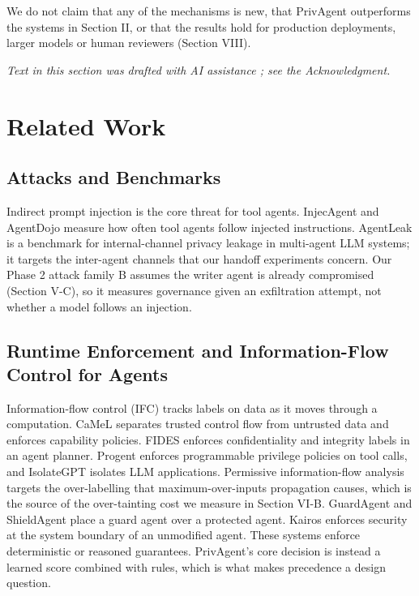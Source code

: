 \documentclass{ieeeaccess}
\begin{document}
We do not claim that any of the mechanisms is new, that PrivAgent outperforms the systems in Section II, or that the results hold for production deployments, larger models or human reviewers (Section VIII).

\emph{Text in this section was drafted with AI assistance \cite{claude}; see the Acknowledgment.}

\section{Related Work}\label{sec:II}

\subsection{Attacks and Benchmarks}

Indirect prompt injection \cite{greshake} is the core threat for tool agents. InjecAgent \cite{injecagent} and AgentDojo \cite{agentdojo} measure how often tool agents follow injected instructions. AgentLeak \cite{agentleak} is a benchmark for internal-channel privacy leakage in multi-agent LLM systems; it targets the inter-agent channels that our handoff experiments concern. %
Our Phase 2 attack family B assumes the writer agent is already compromised (Section V-C), so it measures governance given an exfiltration attempt, not whether a model follows an injection.

\subsection{Runtime Enforcement and Information-Flow Control for Agents}

Information-flow control (IFC) tracks labels on data as it moves through a computation. CaMeL \cite{camel} separates trusted control flow from untrusted data and enforces capability policies. FIDES \cite{fides} enforces confidentiality and integrity labels in an agent planner. Progent \cite{progent} enforces programmable privilege policies on tool calls, and IsolateGPT \cite{isolategpt} isolates LLM applications. Permissive information-flow analysis \cite{permissive} targets the over-labelling that maximum-over-inputs propagation causes, which is the source of the over-tainting cost we measure in Section VI-B. GuardAgent \cite{guardagent} and ShieldAgent \cite{shieldagent} place a guard agent over a protected agent. Kairos \cite{kairos} enforces security at the system boundary of an unmodified agent. %
These systems enforce deterministic or reasoned guarantees. PrivAgent's core decision is instead a learned score combined with rules, which is what makes precedence a design question.
\end{document}
